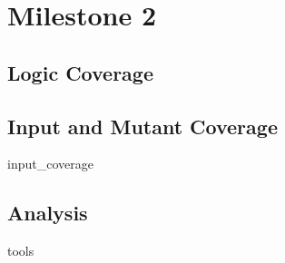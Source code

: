 \section{Milestone 2}

\subsection{Logic Coverage}

\subsection{Input and Mutant Coverage}
\label{sec:input-coverage}
{input_coverage}

\subsection{Analysis}

{tools}
